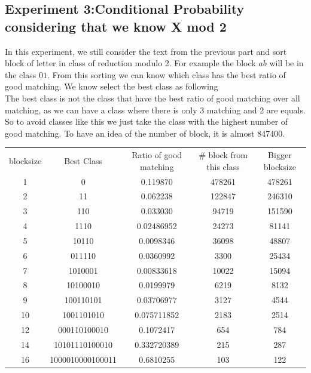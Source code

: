 \documentclass{article}
\begin{document}
\subsection*{Experiment 3:Conditional Probability considering that we know X mod 2}
In this experiment, we still consider the text from the previous part and sort block of letter in class of reduction modulo 2.
For example the block $ab$ will be in the class $01$. From this sorting we can know which class has the best ratio of good matching.
We know select the best class as following\\
The best class is not the class that have the best ratio of good matching over all matching, as we can have a class where there is only 3 matching and 2 are equals. So to avoid classes like this we just take the class with the highest number of good matching.
To have an idea of the number of block, it is almost 847400.\\
\begin{center}
\begin{tabular}{|c|c|c|c|c|}
  \hline
  blocksize & Best Class & Ratio of good matching & \# block from this class & Bigger blocksize\\
	1 & 0 & 0.119870 & 478261 & 478261\\
	2 & 11 & 0.062238 & 122847 & 246310\\
	3 & 110 & 0.033030 & 94719 & 151590\\
	4 & 1110 & 0.02486952 & 24273 & 81141\\
	5 & 10110 & 0.0098346 & 36098 & 48807\\
	6 & 011110 & 0.0360992 & 3300 & 25434\\
	7 & 1010001 & 0.00833618 & 10022 & 15094\\
	8 & 10100010 & 0.0199979 & 6219 & 8132\\
	9 & 100110101 & 0.03706977 & 3127 & 4544\\
	10 & 1001101010 & 0.075711852 & 2183 & 2514\\
	12 & 000110100010 & 0.1072417 & 654 & 784\\
	14 & 10101110100010 & 0.332720389 & 215 & 287\\
	16 & 1000010000100011 & 0.6810255 & 103 & 122\\
	\hline
\end{tabular}\\
\end{center}
\end{document}

